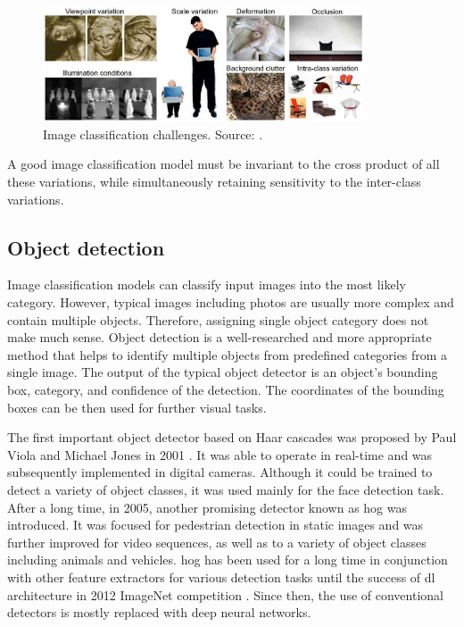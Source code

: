         \begin{figure}[ht]
            \centering
            \includegraphics[width=0.85\textwidth]{resources/image_classification_challenges.png}
            \caption{Image classification challenges. Source: \cite{cs231n}.}
            \label{fig:image_classification_challenges}
        \end{figure}
        
         A good image classification model must be invariant to the cross product of all these variations, while simultaneously retaining sensitivity to the inter-class variations. \cite{cs231n}
         
    \subsection{Object detection}
        Image classification models can classify input images into the most likely category. However, typical images including photos are usually more complex and contain multiple objects. Therefore, assigning single object category does not make much sense. Object detection is a well-researched and more appropriate method that helps to identify multiple objects from predefined categories from a single image. The output of the typical object detector is an object's bounding box, category, and confidence of the detection. The coordinates of the bounding boxes can be then used for further visual tasks.
        
        The first important object detector based on Haar cascades was proposed by Paul Viola and Michael Jones in 2001 \cite{viola2001rapid}. It was able to operate in real-time and was subsequently implemented in digital cameras. Although it could be trained to detect a variety of object classes, it was used mainly for the face detection task. After a long time, in 2005, another promising detector known as \gls{hog} \cite{dalal2005histograms} was introduced. It was focused for pedestrian detection in static images and was further improved for video sequences, as well as to a variety of object classes including animals and vehicles. \Gls{hog} has been used for a long time in conjunction with other feature extractors for various detection tasks until the success of \gls{dl} architecture in 2012 ImageNet competition \cite{russakovsky2015imagenet}. Since then, the use of conventional detectors is mostly replaced with deep neural networks.
        
